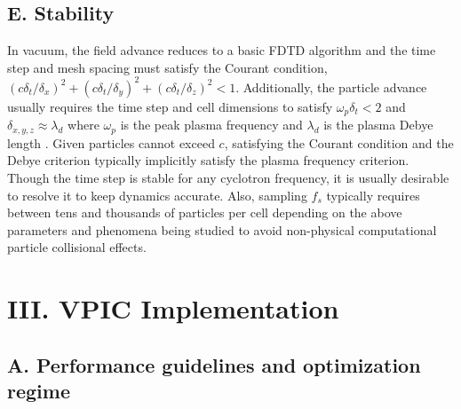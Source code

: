 \documentclass[aps,prl,preprint,preprintnumbers,groupedaddress]{revtex4}
\begin{document}
\subsection{E. Stability}

In vacuum, the field advance reduces to a basic FDTD algorithm
\cite{Yee_1966} and the time step and mesh spacing must satisfy the
Courant condition,
$\left(c\delta_t/\delta_x\right)^2 +
 \left(c\delta_t/\delta_y\right)^2 +
 \left(c\delta_t/\delta_z\right)^2 < 1$.
Additionally, the particle advance usually requires the time step and
cell dimensions to satisfy $\omega_p \delta_t < 2$ and $\delta_{x,y,z}
\approx \lambda_d$ where $\omega_p$ is the peak plasma frequency and
$\lambda_d$ is the plasma Debye length
\cite{Birdsall_Langdon_1985,Hockney_Eastwood_1988}.
Given particles cannot exceed $c$, satisfying the Courant condition
and the Debye criterion typically implicitly satisfy the plasma
frequency criterion.  Though the time step is stable for any cyclotron
frequency, it is usually desirable to resolve it to keep dynamics
accurate.  Also, sampling $f_s$ typically requires between tens and
thousands of particles per cell depending on the above parameters and
phenomena being studied to avoid non-physical computational particle
collisional effects.

\section{III. VPIC Implementation}

\subsection{A. Performance guidelines and optimization regime}
\end{document}
